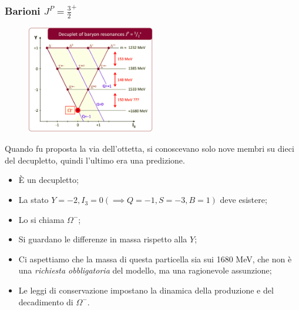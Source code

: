 \subsubsection{Barioni $J^P=\frac32^+$}
\begin{figure}[H]
    \centering
    \includegraphics[width=0.5\textwidth]{immagini/fig_baryon_32_piu.png}
\end{figure}
Quando fu proposta la via dell'ottetta, si conoscevano solo nove membri su dieci del decupletto, quindi l'ultimo era una predizione.
\begin{itemize}
\item È un decupletto;
\item La stato $Y=-2,I_3=0(\implies Q=-1, S=-3, B=1)$ deve esistere;
\item Lo si chiama $\Omega^-$;
\item Si guardano le differenze in massa rispetto alla $Y$;
\item Ci aspettiamo che la massa di questa particella sia sui 1680 MeV, che non è una \textit{richiesta obbligatoria} del modello, ma una ragionevole assunzione;
\item Le leggi di conservazione impostano la dinamica della produzione e del decadimento di $\Omega^-$.
\end{itemize}
